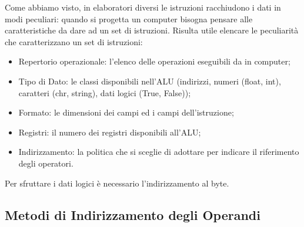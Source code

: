 \documentclass{article}
\begin{document}
Come abbiamo visto, in elaboratori diversi le istruzioni racchiudono i dati in modi peculiari: quando si progetta un computer bisogna pensare alle caratteristiche da dare ad un set di istruzioni. Risulta utile elencare le peculiarità che caratterizzano un set di istruzioni:
\begin{itemize}
	\item Repertorio operazionale: l'elenco delle operazioni eseguibili da in computer;

	\item Tipo di Dato: le classi disponibili nell'ALU (indirizzi, numeri (float, int), caratteri (chr, string), dati logici (True, False));

	\item Formato: le dimensioni dei campi ed i campi dell'istruzione;

	\item Registri: il numero dei registri disponibili all'ALU;

	\item Indirizzamento: la politica che si sceglie di adottare per indicare il riferimento degli operatori.
\end{itemize}

Per sfruttare i dati logici è necessario l'indirizzamento al byte.

\subsection{Metodi di Indirizzamento degli Operandi}
\end{document}
